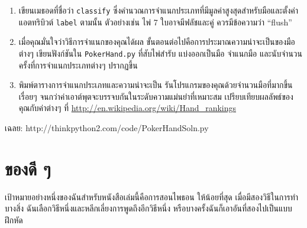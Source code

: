 \begin{exercise}
\begin{enumerate}
\item เขียนเมธอดที่ชื่อว่า {\tt classify} ซึ่งคำนวณการจำแนกประเภทที่มีมูลค่าสูงสุดสำหรับมือและตั้งค่าแอตทริบิวต์ {\tt label} ตามนั้น 
ตัวอย่างเช่น ไพ่ 7 ใบอาจมีฟลัชและคู่ ควรมีข้อความว่า ``flush''

\item เมื่อคุณมั่นใจว่าวิธีการจำแนกของคุณได้ผล ขั้นตอนต่อไปคือการประมาณความน่าจะเป็นของมือต่างๆ เขียนฟังก์ชันใน {\tt PokerHand.py} 
ที่สับไพ่สำรับ แบ่งออกเป็นมือ จำแนกมือ และนับจำนวนครั้งที่การจำแนกประเภทต่างๆ ปรากฏขึ้น


\item พิมพ์ตารางการจำแนกประเภทและความน่าจะเป็น รันโปรแกรมของคุณด้วยจำนวนมือที่มากขึ้นเรื่อยๆ จนกว่าค่าเอาต์พุตจะบรรจบกันในระดับความแม่นยำที่เหมาะสม 
เปรียบเทียบผลลัพธ์ของคุณกับค่าต่างๆ ที่ \url{http://en.wikipedia.org/wiki/Hand_rankings}

\end{enumerate}

เฉลย: http://thinkpython2.com/code/PokerHandSoln.py
\end{exercise}




\chapter{ของดี ๆ} %

เป้าหมายอย่างหนึ่งของฉันสำหรับหนังสือเล่มนี้คือการสอนไพธอน ให้น้อยที่สุด เมื่อมีสองวิธีในการทำบางสิ่ง 
ฉันเลือกวิธีหนึ่งและหลีกเลี่ยงการพูดถึงอีกวิธีหนึ่ง หรือบางครั้งฉันก็เอาอันที่สองไปเป็นแบบฝึกหัด


